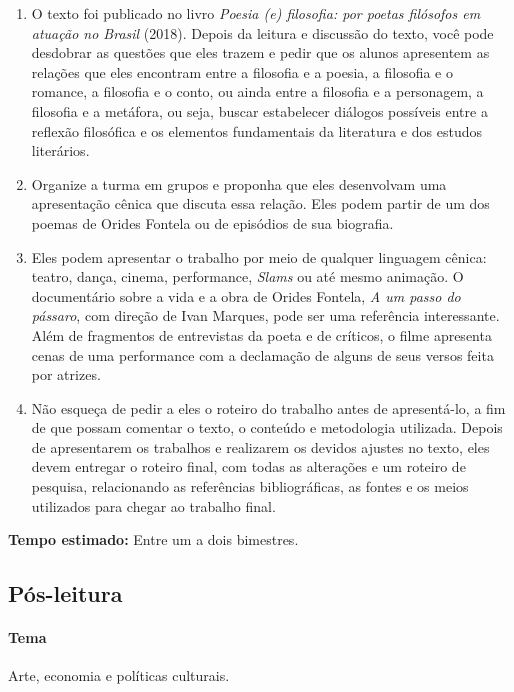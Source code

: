 \documentclass[12pt]{extarticle}
\begin{document}
\begin{enumerate}
\item O texto foi publicado no livro \emph{Poesia (e) filosofia: por poetas
filósofos em atuação no Brasil} (2018). Depois da leitura e discussão do
texto, você pode desdobrar as questões que eles trazem e pedir que os
alunos apresentem as relações que eles encontram entre a filosofia e a
poesia, a filosofia e o romance, a filosofia e o conto, ou ainda entre a
filosofia e a personagem, a filosofia e a metáfora, ou seja, buscar
estabelecer diálogos possíveis entre a reflexão filosófica e os
elementos fundamentais da literatura e dos estudos literários.

\item Organize a turma em grupos e proponha que eles desenvolvam uma
apresentação cênica que discuta essa relação. Eles podem partir de um
dos poemas de Orides Fontela ou de episódios de sua biografia.

\item Eles podem apresentar o trabalho por meio de qualquer linguagem
cênica: teatro, dança, cinema, performance, \emph{Slams} ou até mesmo
animação. O documentário sobre a vida e a obra de Orides Fontela,
\emph{A um passo do pássaro}, com direção de Ivan Marques, pode ser uma
referência interessante. Além de fragmentos de entrevistas da poeta e de
críticos, o filme apresenta cenas de uma performance com a declamação de
alguns de seus versos feita por atrizes.

\item Não esqueça de pedir a eles o roteiro do trabalho antes de
apresentá-lo, a fim de que possam comentar o texto, o conteúdo e
metodologia utilizada. Depois de apresentarem os trabalhos e realizarem
os devidos ajustes no texto, eles devem entregar o roteiro final, com
todas as alterações e um roteiro de pesquisa, relacionando as
referências bibliográficas, as fontes e os meios utilizados para chegar
ao trabalho final.
\end{enumerate}

\textbf{Tempo estimado:} Entre um a dois bimestres.

\subsection{Pós-leitura}

\paragraph{Tema} Arte, economia e políticas culturais.
\end{document}
